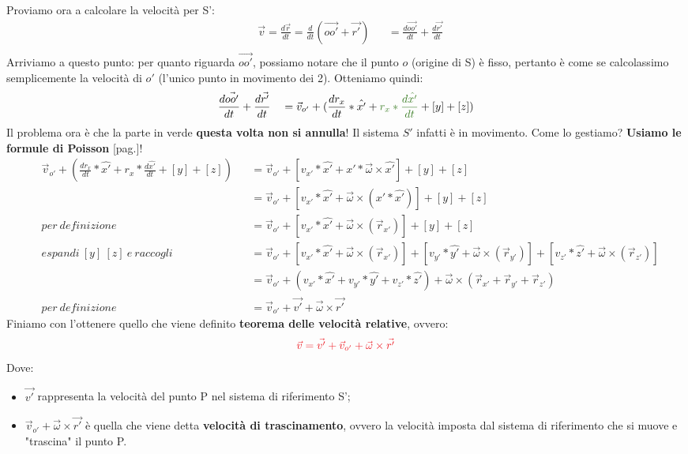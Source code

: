                 Proviamo ora a calcolare la velocità per S':
                \begin{align*}
                    & \vec{v}=\frac{d\vec{r}}{dt}=\frac{d}{dt}(\vec{oo'}+\vec{r'}) &&=\frac{d\vec{oo'}}{dt}+\frac{d\vec{r'}}{dt}\\
                \end{align*}
                Arriviamo a questo punto: per quanto riguarda $\vec{oo'}$, possiamo notare che il punto $o$ (origine di S) è fisso, pertanto è come se calcolassimo semplicemente la velocità di $o'$ (l'unico punto in movimento dei 2). Otteniamo quindi:
                \begin{align*}
                    & \frac{d\vec{oo'}}{dt}+\frac{d\vec{r'}}{dt} &&= \vec{v}_{o'} +(\frac{dr_x}{dt}*\hat{x'}+ \textcolor{OliveGreen}{r_x *\frac{d\hat{x'}}{dt}}+[y]+[z]) \\
                \end{align*}
                Il problema ora è che \textcolor{OliveGreen}{la parte in verde} \textbf{questa volta non si annulla}! Il sistema $S'$ infatti è in movimento. Come lo gestiamo? \textbf{Usiamo le formule di Poisson} [pag.\pageref{Poisson}]!
                \begin{align*}
                    & \vec{v}_{o'} +(\frac{dr_x}{dt}*\hat{x'}+ r_x *\frac{d\hat{x'}}{dt}+[y]+[z]) &&= \vec{v}_{o'} +[ v_{x'}*\hat{x'}+ x'*\vec{\omega}\times\hat{x'}]+[y]+[z]\\
                    & && =\vec{v}_{o'} +[ v_{x'}*\hat{x'}+ \vec{\omega}\times(x'*\hat{x'})]+[y]+[z]\\
                    & per\ definizione&& =\vec{v}_{o'} +[ v_{x'}*\hat{x'}+ \vec{\omega}\times(\vec{r}_{x'})]+[y]+[z]\\
                    & espandi\ [y]\ [z]\ e\ raccogli&& =\vec{v}_{o'} +[ v_{x'}*\hat{x'}+ \vec{\omega}\times(\vec{r}_{x'})]+[ v_{y'}*\hat{y'}+ \vec{\omega}\times(\vec{r}_{y'})]+[ v_{z'}*\hat{z'}+ \vec{\omega}\times(\vec{r}_{z'})]\\
                    & && =\vec{v}_{o'} + (v_{x'}*\hat{x'} + v_{y'}*\hat{y'} + v_{z'}*\hat{z'}) + \vec{\omega}\times(\vec{r}_{x'}+\vec{r}_{y'}+\vec{r}_{z'})\\
                    & per\ definizione&&=\vec{v}_{o'} + \vec{v'} + \vec{\omega}\times\vec{r'}
                \end{align*}
                Finiamo con l'ottenere quello che viene definito \textbf{teorema delle velocità relative}, ovvero:
                \begin{align*}
                    \textcolor{Red}{\vec{v}=\vec{v'} + \vec{v}_{o'} + \vec{\omega}\times\vec{r'}}
                \end{align*}
                Dove:
                \begin{itemize}
                    \item $\vec{v'}$ rappresenta la velocità del punto P nel sistema di riferimento S';
                    \item $\vec{v}_{o'} + \vec{\omega}\times\vec{r'}$ è quella che viene detta \textbf{velocità di trascinamento}, ovvero la velocità imposta dal sistema di riferimento che si muove e "trascina" il punto P.
                \end{itemize}

